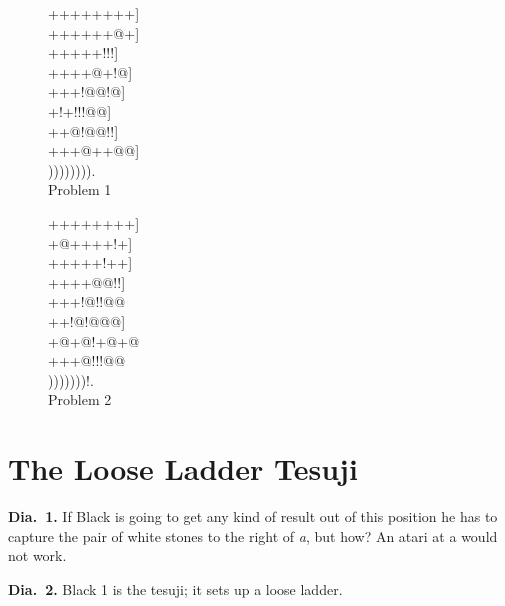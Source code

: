 \documentclass[royalvopaper,10pt,twoside,onecolumn,draft]{memoir}
\begin{document}
\begin{figure}[ht]
    \begin{minipage}[c]{0.5\linewidth}
        \centering    
        {\gnos%
        ++++++++]\\
        ++++++@+]\\
        +++++!!!]\\
        ++++@+!@]\\
        +++!@@!@]\\
        +!+!!!@@]\\
        ++@!@@!!]\\
        +++@++@@]\\
        )))))))).\\
        }
        Problem 1
    \end{minipage}%
    \begin{minipage}[c]{0.5\linewidth}
        \centering    
        {\gnos%
        ++++++++]\\
        +@++++!+]\\
        +++++!++]\\
        ++++@@!!]\\
        +++!@!!@@\\
        ++!@!@@@]\\
        +@+@!+@+@\\
        +++@!!!@@\\
        )))))))!.\\
        }
        Problem 2
    \end{minipage}
\end{figure}

\section{The Loose Ladder Tesuji}
\noindent
\textbf{Dia.\ 1.} If Black is going to get any kind of result out of this position he
has to capture the pair of white stones to the right of \textit{a}, but how? An
atari at a would not work.

\noindent
\textbf{Dia.\ 2.} Black 1 is the tesuji; it sets up a loose ladder.
\end{document}
